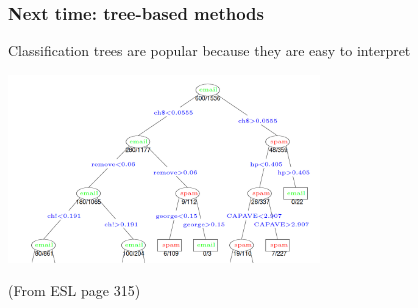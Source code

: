 \documentclass[mathserif]{beamer}
\begin{document}
\begin{frame}
\frametitle{Next time: tree-based methods}
Classification trees are popular because they are easy to interpret

\smallskip
\begin{center}
\includegraphics[width=3.25in]{tree.png}
\end{center}

\bigskip
(From ESL page 315)
\end{frame}
\end{document}
